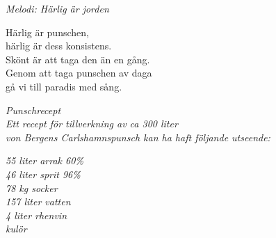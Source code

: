 {\footnotesize\textit{Melodi: Härlig är jorden}}\par
\vspace{10pt}
Härlig är punschen,\\
härlig är dess konsistens.\\
Skönt är att taga den än en gång.\\
Genom att taga punschen av daga\\
gå vi till paradis med sång.\par
\vspace{10pt}
{\footnotesize\textit{Punschrecept\\
Ett recept för tillverkning av ca 300 liter\\
von Bergens Carlshamnspunsch kan ha haft följande utseende:}}\par
\vspace{10pt}
{\footnotesize\textit{55 liter arrak 60\%\\
46 liter sprit 96\%\\
78 kg socker\\
157 liter vatten\\
4 liter rhenvin\\
kulör}}

